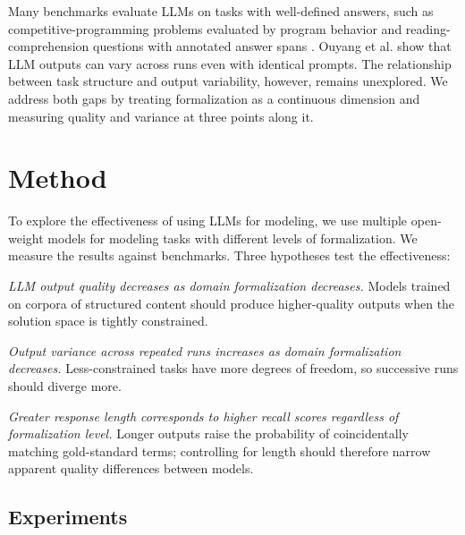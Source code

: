 \documentclass[runningheads]{llncs}
\begin{document}
Many benchmarks evaluate LLMs on tasks with well-defined answers, such as competitive-programming problems evaluated by program behavior \cite{li2022alphacode} and reading-comprehension questions with annotated answer spans \cite{rajpurkar2016squad}. Ouyang et al. \cite{ouyang2023llm} show that LLM outputs can vary across runs even with identical prompts. The relationship between task structure and output variability, however, remains unexplored. We address both gaps by treating formalization as a continuous dimension and measuring quality and variance at three points along it.

\section{Method}
\label{sec:method}

To explore the effectiveness of using LLMs for modeling, we use multiple open-weight models for modeling tasks with different levels of formalization. We measure the results against benchmarks. Three hypotheses test the effectiveness: 

\begin{description}[noitemsep,leftmargin=2em,style=nextline]
  \item[H1: Quality gradient]
  \textit{LLM output quality decreases
  as domain formalization decreases.} Models trained on corpora 
  of structured content should produce higher-quality outputs when the solution space is tightly constrained.

  \item[H2: Variance gradient]
  \textit{Output variance across repeated runs increases as domain formalization decreases.} Less-constrained tasks have more degrees of freedom, so successive runs should diverge more.

  \item[H3: Length--quality mediation]
  \textit{Greater response length corresponds to higher recall scores regardless of formalization level.} Longer outputs raise the probability of coincidentally matching gold-standard terms; controlling for length should therefore narrow apparent quality differences between models.
\end{description}


\subsection{Experiments}
\end{document}
